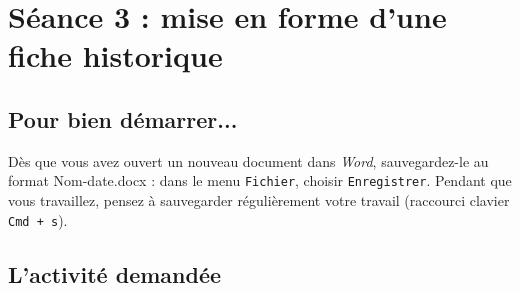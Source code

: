 \newpage

\section{Séance 3 : mise en forme d'une fiche historique}\label{ficheTexte5e3}

\subsection{Pour bien démarrer...}

Dès que vous avez ouvert un nouveau document dans \emph{Word}, sauvegardez-le au format Nom-date.docx : dans le menu \texttt{Fichier}, choisir \texttt{Enregistrer}. Pendant que vous travaillez, pensez à sauvegarder régulièrement votre travail (raccourci clavier \texttt{Cmd + s}).   


\subsection{L'activité demandée}


